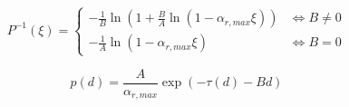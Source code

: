 \begin{equation}
	P^{-1} \left( \xi \right) = \begin{cases}
		- \frac 1 B \ln \left(1 + \frac B A \ln \left(1 - \alpha_{r,max} \xi\right)\right) & \Leftrightarrow B \neq 0\\
		- \frac 1 A \ln \left(1 - \alpha_{r,max} \xi\right) & \Leftrightarrow B = 0
	\end{cases}
\end{equation}

\begin{equation}
	p \left(d\right) = \frac A {\alpha_{r,max}} \exp \left( -\tau \left(d\right) - B d \right)
\end{equation}
